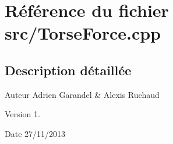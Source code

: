 \section{Référence du fichier src/\-Torse\-Force.cpp}
\label{_torse_force_8cpp}


\subsection{Description détaillée}
\begin{DoxyAuthor}{Auteur}
Adrien Garandel \& Alexis Ruchaud 
\end{DoxyAuthor}
\begin{DoxyVersion}{Version}
1. 
\end{DoxyVersion}
\begin{DoxyDate}{Date}
27/11/2013 
\end{DoxyDate}
